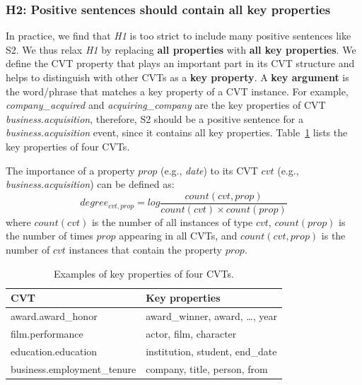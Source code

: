
\subsubsection{H2: Positive sentences should contain all key properties}
In practice, we find that \emph{H1} is too strict to include many positive sentences like S2. 
We thus relax \emph{H1} by replacing \textbf{all properties} with \textbf{all key properties}. We define the CVT property that plays an important part in its CVT structure and helps to distinguish with other CVTs as a \textbf{key property}. A \textbf{key argument} is the word/phrase that matches a key property of a CVT instance. For example, \emph{company\_acquired} and \emph{acquiring\_company} are the key properties of CVT \emph{business.acquisition}, therefore,  S2 should be a positive sentence for a \emph{business.acquisition} event, since it contains all key properties. Table~\ref{tab:5} lists the key properties of four CVTs.

The importance of a property $prop$ (e.g., \emph{date}) to its CVT $cvt$ (e.g., \emph{business.acquisition}) can be defined as:
\begin{equation}
	degree_{cvt, prop} = log \frac{count(cvt, prop)}{count(cvt) \times count(prop)} 
\end{equation}
where $count(cvt)$ is the number of all instances of type $cvt$, $count(prop)$ is the number of times $prop$ appearing in all CVTs, and $count(cvt, prop)$ is the number of $cvt$ instances that contain the property $prop$.

\begin{table}
\centering
\small
\begin{tabular}{|l|l|} \hline
CVT & Key properties \\ \hline
award.award\_honor & award\_winner, award, \ldots, year \\ \hline
film.performance & actor, film, character \\ \hline
education.education & institution, student, end\_date \\ \hline
business.employment\_tenure & company, title, person, from \\ \hline
\end{tabular}
\caption{Examples of key properties of four CVTs.\label{tab:5}}
\end{table}

